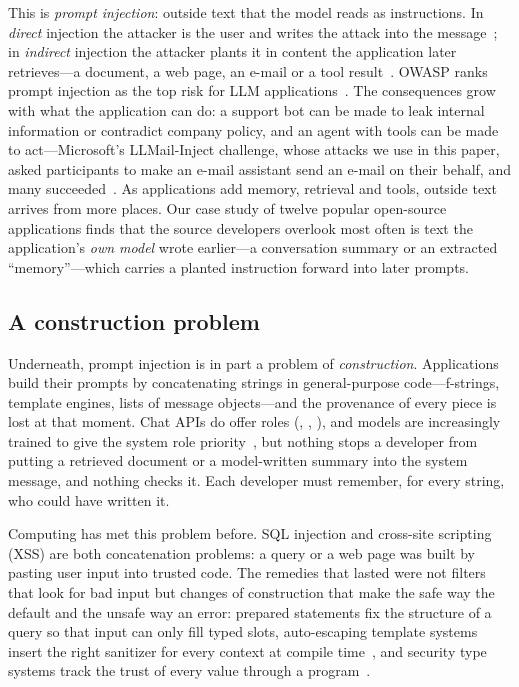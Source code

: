 \documentclass[journal]{IEEEtran}
\begin{document}
This is \emph{prompt injection}: outside text that the model reads as instructions. In \emph{direct} injection the attacker is the user and writes the attack into the message~\cite{perez2022ignore}; in \emph{indirect} injection the attacker plants it in content the application later retrieves---a document, a web page, an e-mail or a tool result~\cite{greshake2023indirect}. OWASP ranks prompt injection as the top risk for LLM applications~\cite{owasp2025}. The consequences grow with what the application can do: a support bot can be made to leak internal information or contradict company policy, and an agent with tools can be made to act---Microsoft's LLMail-Inject challenge, whose attacks we use in this paper, asked participants to make an e-mail assistant send an e-mail on their behalf, and many succeeded~\cite{abdelnabi2025llmail}. As applications add memory, retrieval and tools, outside text arrives from more places. Our case study of twelve popular open-source applications finds that the source developers overlook most often is text the application's \emph{own model} wrote earlier---a conversation summary or an extracted ``memory''---which carries a planted instruction forward into later prompts.

\subsection{A construction problem}
Underneath, prompt injection is in part a problem of \emph{construction}. Applications build their prompts by concatenating strings in general-purpose code---f-strings, template engines, lists of message objects---and the provenance of every piece is lost at that moment. Chat APIs do offer roles (, , ), and models are increasingly trained to give the system role priority~\cite{wallace2024hierarchy}, but nothing stops a developer from putting a retrieved document or a model-written summary into the system message, and nothing checks it. Each developer must remember, for every string, who could have written it.

Computing has met this problem before. SQL injection and cross-site scripting (XSS) are both concatenation problems: a query or a web page was built by pasting user input into trusted code. The remedies that lasted were not filters that look for bad input but changes of construction that make the safe way the default and the unsafe way an error: prepared statements fix the structure of a query so that input can only fill typed slots, auto-escaping template systems insert the right sanitizer for every context at compile time~\cite{samuel2011csas}, and security type systems track the trust of every value through a program~\cite{volpano1996sound,sabelfeld2003language}.
\end{document}
